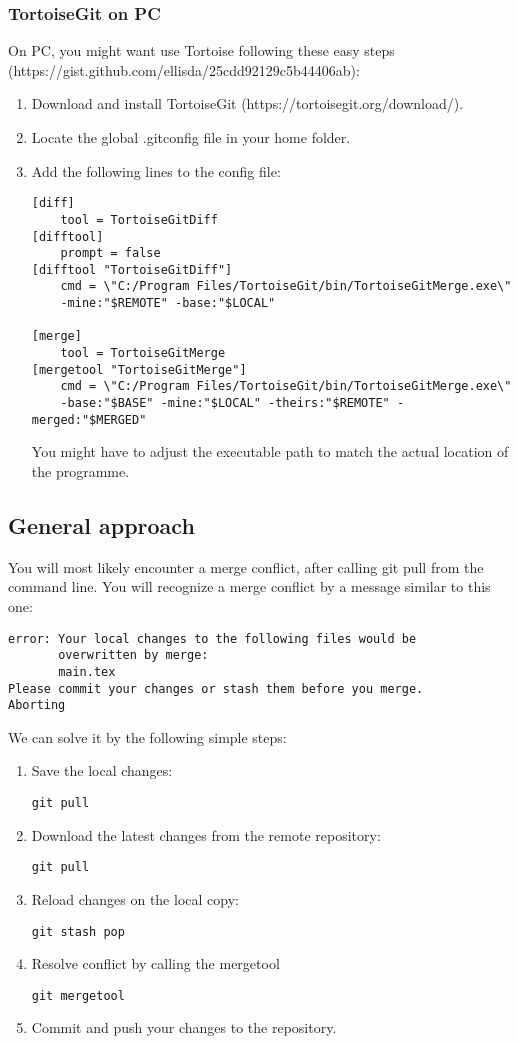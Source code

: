 \documentclass{article}
\begin{document}
\subsubsection{TortoiseGit on PC}
On PC, you might want use Tortoise following these easy steps (https://gist.github.com/ellisda/25cdd92129c5b44406ab):
\begin{enumerate}
    \item Download and install TortoiseGit (https://tortoisegit.org/download/).
    \item Locate the global .gitconfig file in your home folder.
    \item Add the following lines to the config file:
    \begin{verbatim}
[diff]
    tool = TortoiseGitDiff	
[difftool]
    prompt = false
[difftool "TortoiseGitDiff"]
    cmd = \"C:/Program Files/TortoiseGit/bin/TortoiseGitMerge.exe\"
    -mine:"$REMOTE" -base:"$LOCAL" 

[merge]
    tool = TortoiseGitMerge	
[mergetool "TortoiseGitMerge"]
    cmd = \"C:/Program Files/TortoiseGit/bin/TortoiseGitMerge.exe\"
    -base:"$BASE" -mine:"$LOCAL" -theirs:"$REMOTE" -merged:"$MERGED"
    \end{verbatim}
    You might have to adjust the executable path to match the actual location of the programme.
\end{enumerate}

\subsection{General approach}
You will most likely encounter a merge conflict, after calling git pull from the command line. You will recognize a merge conflict by a message similar to this one:
\begin{verbatim}
error: Your local changes to the following files would be 
       overwritten by merge:
       main.tex
Please commit your changes or stash them before you merge. 
Aborting
\end{verbatim}
We can solve it by the following simple steps:
\begin{enumerate}
    \item Save the local changes:
    \begin{verbatim}
git pull
    \end{verbatim}
    \item  Download the latest changes from the remote repository:
    \begin{verbatim}
git pull
    \end{verbatim}
    \item Reload changes on the local copy:
    \begin{verbatim}
git stash pop
    \end{verbatim}
    \item Resolve conflict by calling the mergetool
    \begin{verbatim}
git mergetool
    \end{verbatim}
    \item Commit and push your changes to the repository.
\end{enumerate}
\end{document}
